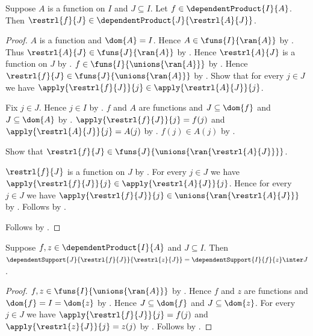 \begin{proposition}\label{dependent_restriction_type}
    Suppose $A$ is a function on $I$ and $J\subseteq I$.
    Let $f\in\dependentProduct{I}{A}$.
    Then
        $\restrl{f}{J}\in
            \dependentProduct{J}{\restrl{A}{J}}$.
\end{proposition}
\begin{proof}
    $A$ is a function and $\dom{A}=I$.
    Hence $A\in\funs{I}{\ran{A}}$ by
        .
    Thus $\restrl{A}{J}\in\funs{J}{\ran{A}}$ by
        .
    Hence $\restrl{A}{J}$ is a function on $J$ by
        .
    $f\in\funs{I}{\unions{\ran{A}}}$ by
        .
    Hence $\restrl{f}{J}\in\funs{J}{\unions{\ran{A}}}$ by
        .
    Show that for every $j\in J$ we have
        $\apply{\restrl{f}{J}}{j}
            \in\apply{\restrl{A}{J}}{j}$.
    \begin{subproof}
        Fix $j\in J$.
        Hence $j\in I$ by .
        $f$ and $A$ are functions and
            $J\subseteq\dom{f}$ and $J\subseteq\dom{A}$ by
            .
        $\apply{\restrl{f}{J}}{j}=f(j)$ and
            $\apply{\restrl{A}{J}}{j}=A(j)$ by
            .
        $f(j)\in A(j)$ by .
    \end{subproof}
    Show that $\restrl{f}{J}\in
        \funs{J}{\unions{\ran{\restrl{A}{J}}}}$.
    \begin{subproof}
        $\restrl{f}{J}$ is a function on $J$ by
            .
        For every $j\in J$ we have
            $\apply{\restrl{f}{J}}{j}
                \in\apply{\restrl{A}{J}}{j}$.
        Hence for every $j\in J$ we have
            $\apply{\restrl{f}{J}}{j}
                \in\unions{\ran{\restrl{A}{J}}}$ by
            .
        Follows by .
    \end{subproof}
    Follows by .
\end{proof}

\begin{theorem}\label{dependent_support_of_restriction}
    Suppose $f,z\in\dependentProduct{I}{A}$ and $J\subseteq I$.
    Then
        $\dependentSupport{J}{\restrl{f}{J}}{\restrl{z}{J}}
        =\dependentSupport{I}{f}{z}\inter J$.
\end{theorem}
\begin{proof}
    $f,z\in\funs{I}{\unions{\ran{A}}}$ by
        .
    Hence $f$ and $z$ are functions and
        $\dom{f}=I=\dom{z}$ by
        .
    Hence $J\subseteq\dom{f}$ and $J\subseteq\dom{z}$.
    For every $j\in J$ we have
        $\apply{\restrl{f}{J}}{j}=f(j)$ and
        $\apply{\restrl{z}{J}}{j}=z(j)$ by
        .
    Follows by
        .
\end{proof}

